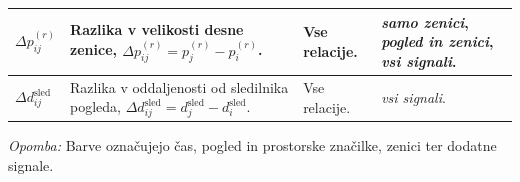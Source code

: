 \begin{table}[H]
\begin{tabularx}{\textwidth}{@{}>{\raggedright\arraybackslash}p{} >{\raggedright\arraybackslash}X >{\raggedright\arraybackslash}p{} >{\raggedright\arraybackslash}p{}@{}}
        \midrule
        \textcolor{tablePupil}{$\Delta p^{(r)}_{ij}$} & Razlika v velikosti desne zenice, \textcolor{tablePupil}{$\Delta p^{(r)}_{ij} = p_j^{(r)} - p_i^{(r)}$}. & Vse relacije. & \emph{samo zenici}, \emph{pogled in zenici}, \emph{vsi signali}. \\
        \midrule
        \textcolor{tableFixation}{$\Delta d_{ij}^{\text{sled}}$} & Razlika v oddaljenosti od sledilnika pogleda, \textcolor{tableFixation}{$\Delta d_{ij}^{\text{sled}} = d_j^{\text{sled}} - d_i^{\text{sled}}$}. & Vse relacije. & \emph{vsi signali}. \\
        \bottomrule
    \end{tabularx}
    \vspace{0.4em}
    \parbox{\textwidth}{\footnotesize \emph{Opomba:} Barve označujejo \textcolor{tableTime}{čas}, \textcolor{tableGaze}{pogled in prostorske značilke}, \textcolor{tablePupil}{zenici} ter \textcolor{tableFixation}{dodatne signale}.}
    \endgroup
\end{table}
